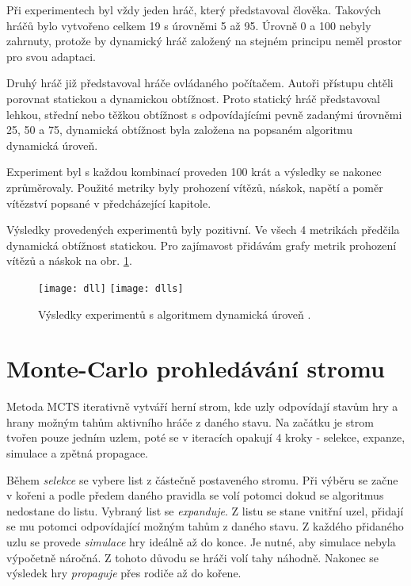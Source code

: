 Při experimentech byl vždy jeden hráč, který představoval člověka. Takových hráčů bylo vytvořeno celkem 19 s úrovněmi 5 až 95. Úrovně 0 a 100 nebyly zahrnuty, protože by dynamický hráč založený na stejném principu neměl prostor pro svou adaptaci.

Druhý hráč již představoval hráče ovládaného počítačem. Autoři přístupu chtěli porovnat statickou a dynamickou obtížnost. Proto statický hráč představoval lehkou, střední nebo těžkou obtížnost s odpovídajícími pevně zadanými úrovněmi 25, 50 a 75, dynamická obtížnost byla založena na popsaném algoritmu dynamická úroveň.

Experiment byl s každou kombinací proveden 100 krát a výsledky se nakonec zprůměrovaly. Použité metriky byly prohození vítězů, náskok, napětí a poměr vítězství popsané v předcházející kapitole. 

Výsledky provedených experimentů byly pozitivní. Ve všech 4 metrikách předčila dynamická obtížnost statickou. Pro zajímavost přidávám grafy metrik prohození vítězů a náskok na obr. \ref{fig:ch3dlmet}.

\begin{figure}
  \centering
  \texttt{[image: dll]}
	\texttt{[image: dlls]}
	\caption{Výsledky experimentů s algoritmem dynamická úroveň \cite{24DynLev}.}
	\label{fig:ch3dlmet}
\end{figure}

\section{Monte-Carlo prohledávání stromu} 

Metoda MCTS iterativně vytváří herní strom, kde uzly odpovídají stavům hry a hrany možným tahům aktivního hráče z daného stavu. Na začátku je strom tvořen pouze jedním uzlem, poté se v iteracích opakují 4 kroky - selekce, expanze, simulace a zpětná propagace. 

Během \emph{selekce} se vybere list z částečně postaveného stromu. Při výběru se začne v kořeni a podle předem daného pravidla se volí potomci dokud se algoritmus nedostane do listu. Vybraný list se \emph{expanduje}. Z listu se stane vnitřní uzel, přidají se mu potomci odpovídající možným tahům z daného stavu. Z každého přidaného uzlu se provede \emph{simulace} hry ideálně až do konce. Je nutné, aby simulace nebyla výpočetně náročná. Z tohoto důvodu se hráči volí tahy náhodně. Nakonec se výsledek hry \emph{propaguje} přes rodiče až do kořene.

